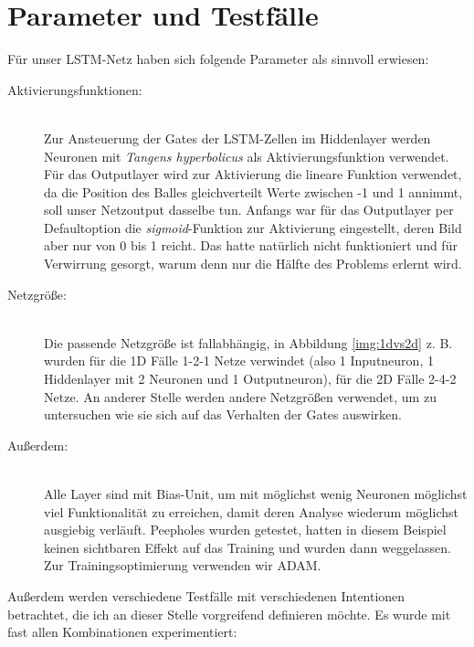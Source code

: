 \section{Parameter und Testfälle}
Für unser LSTM-Netz haben sich folgende Parameter als sinnvoll erwiesen:
\begin{description}	\item[Aktivierungsfunktionen:]\hfill \\ 
	Zur Ansteuerung der Gates der LSTM-Zellen im Hiddenlayer werden Neuronen mit \textit{Tangens hyperbolicus} als Aktivierungsfunktion verwendet. Für das Outputlayer wird zur Aktivierung die lineare Funktion verwendet, da die Position des Balles gleichverteilt Werte zwischen -1 und 1 annimmt, soll unser Netzoutput dasselbe tun. Anfangs war für das Outputlayer per Defaultoption die \textit{sigmoid}-Funktion zur Aktivierung eingestellt, deren Bild aber nur von 0 bis 1 reicht. Das hatte natürlich nicht funktioniert und für Verwirrung gesorgt, warum denn nur die Hälfte des Problems erlernt wird.  
	\item[Netzgröße:]\hfill \\ 
	Die passende Netzgröße ist fallabhängig, in Abbildung \ref{img:1dvs2d} z. B. wurden für die 1D Fälle 1-2-1 Netze verwindet (also 1 Inputneuron, 1 Hiddenlayer mit 2 Neuronen und 1 Outputneuron), für die 2D Fälle 2-4-2 Netze. An anderer Stelle werden andere Netzgrößen verwendet, um zu untersuchen wie sie sich auf das Verhalten der Gates auswirken.
	\item[Außerdem:]\hfill \\
	Alle Layer sind mit Bias-Unit, um mit möglichst wenig Neuronen möglichst viel Funktionalität zu erreichen, damit deren Analyse wiederum möglichst ausgiebig verläuft. Peepholes wurden getestet, hatten in diesem Beispiel keinen sichtbaren Effekt auf das Training und wurden dann weggelassen. Zur Trainingsoptimierung verwenden wir ADAM.
\end{description}
Außerdem werden verschiedene Testfälle mit verschiedenen Intentionen betrachtet, die ich an dieser Stelle vorgreifend definieren möchte. Es wurde mit fast allen Kombinationen experimentiert:
